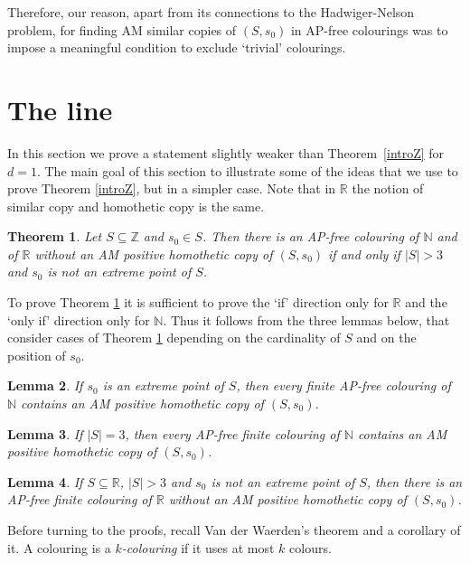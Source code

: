\documentclass[12pt]{article}
\theoremstyle{plain}
\newtheorem{theorem}{Theorem}
\newtheorem{lemma}[theorem]{Lemma}
\theoremstyle{definition}
\begin{document}
Therefore, our reason, apart from its connections to the Hadwiger-Nelson problem, for finding AM similar copies of $(S,s_0)$ in AP-free colourings was to impose a meaningful condition to exclude `trivial' colourings.




\section{The line}\label{21}
In this section we prove a statement slightly weaker than Theorem~\ref{introZ} for $d=1$. The main goal of this section to illustrate some of the ideas that we use to prove Theorem \ref{introZ}, but in a simpler case. Note that in $\mathbb{R}$ the notion of similar copy and homothetic copy is the same. 

\begin{theorem}\label{introsimilar1}
Let $S\subseteq \mathbb{Z}$ and $s_0\in S$. Then there is an AP-free colouring of $\mathbb{N}$ and of $\mathbb{R}$ without an AM positive homothetic copy of $(S,s_0)$ if and only if $|S|>3$ and $s_0$ is not an extreme point of $S$.
\end{theorem}




To prove Theorem \ref{introsimilar1} it is sufficient to prove the `if' direction only for $\mathbb{R}$ and the `only if' direction only for $\mathbb{N}$. Thus it follows from the three lemmas below, that consider cases of Theorem \ref{introsimilar1} depending on the cardinality of $S$ and on the position of $s_0$.

\begin{lemma}\label{1extreme} If $s_0$ is an extreme point of $S$, then every finite AP-free colouring of $\mathbb{N}$ contains an AM positive homothetic copy of $(S,s_0)$.
\end{lemma}

\begin{lemma}\label{three} If $|S|=3$, then every AP-free finite colouring of $\mathbb{N}$ contains an AM positive homothetic copy of $(S,s_0)$.
\end{lemma}

\begin{lemma}\label{1notextreme} If $S\subseteq \mathbb{R}$, $|S|>3$ and $s_0$ is not an extreme point of $S$, then there is an AP-free finite colouring of $\mathbb R$ without an AM positive homothetic copy of $(S,s_0)$.
\end{lemma}


Before turning to the proofs, recall Van der Waerden's theorem \cite{vdW} and a corollary of it. A colouring is a \emph{$k$-colouring} if it uses at most $k$ colours.
\end{document}

